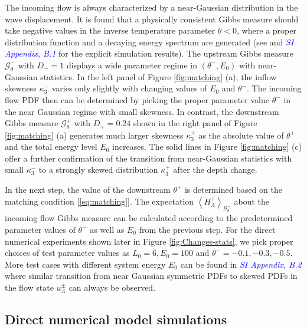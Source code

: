 \documentclass[9pt,twocolumn,twoside,lineno]{pnas-new}
\begin{document}
The incoming flow is always characterized by a near-Gaussian distribution
in the wave displacement. It is found that a physically consistent
Gibbs measure should take negative values in the inverse temperature
parameter $\theta<0$, where a proper distribution function and a
decaying energy spectrum are generated (see \cite{bajars2013weakly}
and \textcolor{blue}{\emph{SI Appendix, B.1}} for the explicit simulation results).
The upstream Gibbs measure $\mathcal{G}_{\theta}^{-}$ with $D_{-}=1$
displays a wide parameter regime in $\left(\theta^{-},E_{0}\right)$
with near-Gaussian statistics. In the left panel of Figure \ref{fig:matching}
(a), the inflow skewness $\kappa_3^{-}$ varies only slightly 
with changing values of $E_{0}$ and $\theta^{-}$. The incoming
flow PDF then can be determined by picking the proper parameter value
$\theta^{-}$ in the near Gaussian regime with small skewness. In
contrast, the downstream Gibbs measure $\mathcal{G}_{\theta}^{+}$
with $D_{+}=0.24$ shown in the right panel of Figure \ref{fig:matching}
(a) generates much larger skewness $\kappa_3^{+}$ 
as the absolute value of $\theta^{+}$ and the total energy level
$E_{0}$ increases. The solid lines in Figure \ref{fig:matching}
(c) offer a further confirmation of the transition from near-Gaussian
statistics with small $\kappa_3^{-}$ to a strongly skewed distribution
$\kappa_3^{+}$ after the depth change.

In the next step, the value of the downstream $\theta^{+}$ is determined
based on the matching condition [\ref{eq:matching}]. The expectation
$\left\langle H_{\Lambda}^{+}\right\rangle _{\mathcal{G}_{\theta}^{-}}$
about the incoming flow Gibbs measure can be calculated according
to the predetermined parameter values of $\theta^{-}$ as well as
$E_{0}$ from the previous step. For the direct numerical experiments
shown later in Figure \ref{fig:Changes-stats}, we pick proper choices
of test parameter values as $L_{0}=6, E_{0}=100$ and $\theta^{-}=-0.1,-0.3,-0.5$.
More test cases with different system energy $E_{0}$ can be found
in \textcolor{blue}{\emph{SI Appendix, B.2}} where similar transition from near
Gaussian symmetric PDFs to skewed PDFs in the flow state $u_{\Lambda}^{\pm}$
can always be observed.

\subsection{Direct numerical model simulations}
\end{document}
